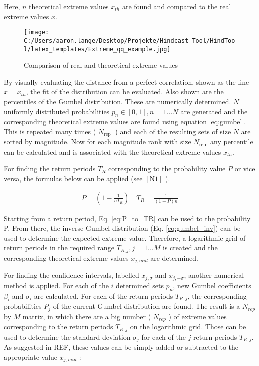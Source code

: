 Here, $n$ theoretical extreme values $x_{t h}$ are found and compared to the real extreme values $x$.

\begin{figure}[H] 
 \centering 
 \texttt{[image: C:/Users/aaron.lange/Desktop/Projekte/Hindcast\_Tool/HindTool/latex\_templates/Extreme\_qq\_example.jpg]} 
 \caption{ Comparison of real and theoretical extreme values } 
 \label{fig: Extreme_qq_example } 
\end{figure}

By visually evaluating the distance from a perfect correlation, shown as the line $x=x_{t h}$, the fit of the distribution can be evaluated. Also shown are the percentiles of the Gumbel distribution. These are numerically determined. $N$ uniformly distributed probabilities $p_{n} \in[0,1], n=1 \ldots N$ are generated and the corresponding theoretical extreme values are found using equation \ref{eq:gumbel}. This is repeated many times ( $N_{\text {rep }}$ ) and each of the resulting sets of size $N$ are sorted by magnitude. Now for each magnitude rank with size $N_{\text {rep }}$ any percentile can be calculated and is associated with the theoretical extreme values $x_{t h}$.

For finding the return periods $T_{R}$ corresponding to the probability value $P$ or vice versa, the formulas below can be applied (see $[\mathrm{N} 1]$ ).

\begin{align}
\label{eq:P_to_TR}
   P=\left(1-\frac{1}{n T_{R}}\right) \quad T_{R}=\frac{1}{(1-P) n}
\end{align}


Starting from a return period, Eq. \ref{eq:P_to_TR} can be used to the probability P. From there, the inverse Gumbel distribution (Eq. \ref{eq:gumbel_inv}) can be used to determine the expected extreme value. Therefore, a logarithmic grid of return periods in the required range $T_{R, j}, j=1 \ldots M$ is created and the corresponding theoretical extreme values $x_{j, m i d}$ are determined.

For finding the confidence intervals, labelled $x_{j, \sigma}$ and $x_{j,-\sigma}$, another numerical method is applied. For each of the $i$ determined sets $p_{n}$, new Gumbel coefficients $\beta_{i}$ and $\sigma_{i}$ are calculated. For each of the return periods $T_{R, j}$, the corresponding probabilities $P_{j}$ of the current Gumbel distribution are found. The result is a $N_{r e p}$ by $M$ matrix, in which there are a big number ( $N_{r e p}$ ) of extreme values corresponding to the return periods $T_{R, j}$ on the logarithmic grid. Those can be used to determine the standard deviation $\sigma_{j}$ for each of the $j$ return periods $T_{R, j}$. As suggested in REF, these values can be simply added or subtracted to the appropriate value $x_{j, m i d}$ :

